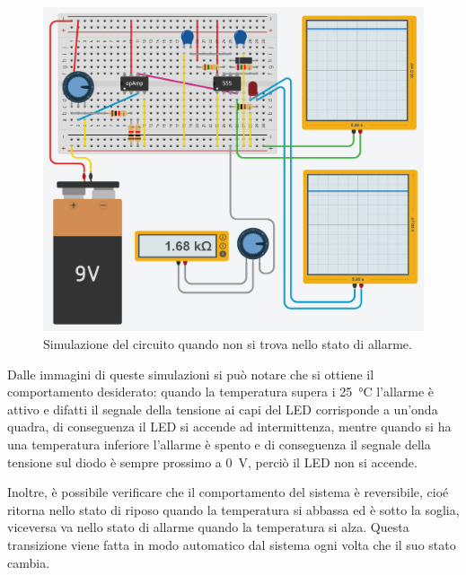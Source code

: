 \documentclass{report}
\begin{document}
\begin{figure}[h!]
	\centering
	\includegraphics[width=\textwidth]{immagini/tinkercad_off}
	\caption{Simulazione del circuito quando non si trova nello stato di allarme.} 
	\label{figura:tinkercad_off}
\end{figure}

Dalle immagini di queste simulazioni si può notare che si ottiene il comportamento desiderato: quando la temperatura supera i \SI{25}{\celsius} l'allarme è attivo e difatti il segnale della tensione ai capi del LED corrisponde a un'onda quadra, di conseguenza il LED si accende ad intermittenza, mentre quando si ha una temperatura inferiore l'allarme è spento e di conseguenza il segnale della tensione sul diodo è sempre prossimo a \SI{0}{\volt}, perciò il LED non si accende. 

Inoltre, è possibile verificare che il comportamento del sistema è reversibile, cioé ritorna nello stato di riposo quando la temperatura si abbassa ed è sotto la soglia, viceversa va nello stato di allarme quando la temperatura si alza. Questa transizione viene fatta in modo automatico dal sistema ogni volta che il suo stato cambia.
\end{document}
